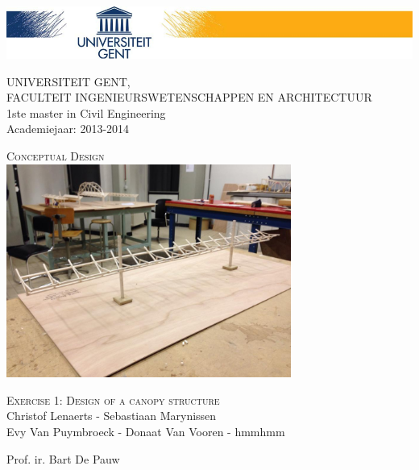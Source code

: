 \documentclass[a4paper]{article}
\begin{document}
\begin{titlepage}
\includegraphics[width=\textwidth]{Hoofding.png}
\begin{flushleft}
UNIVERSITEIT GENT,\\
FACULTEIT INGENIEURSWETENSCHAPPEN EN ARCHITECTUUR\\
1ste master in Civil Engineering\\
Academiejaar: 2013-2014
\end{flushleft}

\begin{center}

\vspace*{\fill}

\textsc{\huge Conceptual Design}\\
[1.5cm]
\includegraphics[width=0.7\textwidth]{ons.jpg}

\vspace{1.5cm}

\textsc{\LARGE Exercise 1: Design of a canopy structure}\\
[1cm]
Christof Lenaerts - Sebastiaan Marynissen \\
Evy Van Puymbroeck - Donaat Van Vooren - hmmhmm
\vspace*{\fill}

\end{center}

\begin{flushbottom}
\begin{flushleft}
Prof. ir. Bart De Pauw \\
\end{flushleft}
\end{flushbottom}

\end{titlepage}
\end{document}
